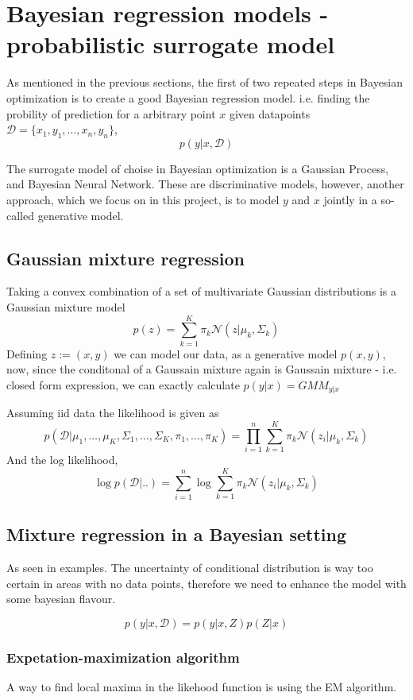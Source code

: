 \chapter{Bayesian regression models - probabilistic surrogate model}
As mentioned in the previous sections, the first of two repeated steps in Bayesian optimization
is to create a good Bayesian regression model. %
i.e. finding the probility of prediction for a arbitrary point $x$ given datapoints 
$\mathcal{D} = \{x_1, y_1, \dots, x_n, y_n\}$, 
 $$p(y|x,\mathcal{D})$$

The surrogate model of choise in Bayesian optimization is a Gaussian Process, and Bayesian Neural Network.
These are discriminative models, however, another approach, which we focus on in this project, is
to model $y$ and $x$ jointly in a so-called generative model.

\section{Gaussian mixture regression}
Taking a convex combination of a set of multivariate Gaussian distributions is a Gaussian mixture model
$$p(z) = \sum_{k=1}^K \pi_k \mathcal{N}(z|\mu_k, \Sigma_k)$$  
Defining $z := (x,y)$ we can model our data, as a generative model $p(x,y)$, now, since the conditonal 
of a Gaussain mixture again is Gaussain mixture - i.e. closed form expression, we can exactly calculate
$p(y|x) = GMM_{y|x}$

Assuming iid data the likelihood is given as 
$$p(\mathcal{D}|\mu_1, \dots, \mu_K, \Sigma_1, \dots, \Sigma_K, \pi_1, \dots, \pi_K) = \prod_{i=1}^n \sum_{k=1}^K \pi_k \mathcal{N}(z_i|\mu_k, \Sigma_k)$$
And the log likelihood, 
$$\log p(\mathcal{D}| ..) = \sum_{i=1}^n \log \sum_{k=1}^K \pi_k \mathcal{N}(z_i|\mu_k, \Sigma_k)$$


\section{Mixture regression in a Bayesian setting}
As seen in examples. The uncertainty of conditional distribution is way too certain
in areas with no data points, therefore we need to enhance the model with some bayesian 
flavour. 

$$p(y|x,\mathcal{D}) = p(y|x,Z)p(Z|x)$$



\subsection*{Expetation-maximization algorithm}
A way to find local maxima in the likehood function is using the EM algorithm. 

